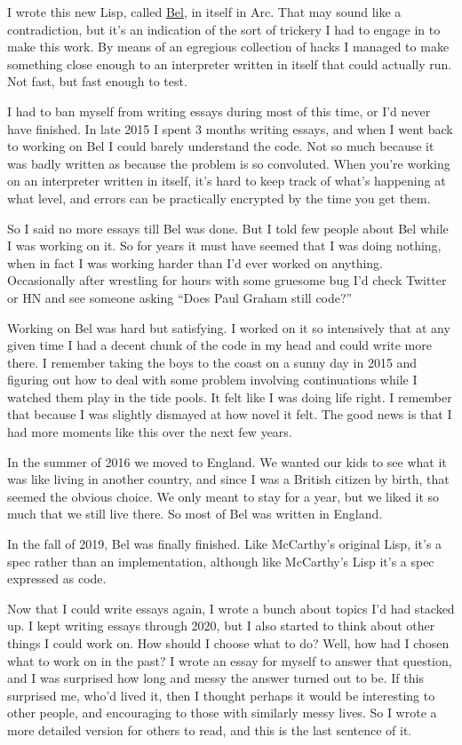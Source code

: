 I wrote this new Lisp, called \href{bel.html}{Bel}, in itself in Arc.
That may sound like a contradiction, but it's an indication of the sort
of trickery I had to engage in to make this work. By means of an
egregious collection of hacks I managed to make something close enough
to an interpreter written in itself that could actually run. Not fast,
but fast enough to test.

I had to ban myself from writing essays during most of this time, or I'd
never have finished. In late 2015 I spent 3 months writing essays, and
when I went back to working on Bel I could barely understand the code.
Not so much because it was badly written as because the problem is so
convoluted. When you're working on an interpreter written in itself,
it's hard to keep track of what's happening at what level, and errors
can be practically encrypted by the time you get them.

So I said no more essays till Bel was done. But I told few people about
Bel while I was working on it. So for years it must have seemed that I
was doing nothing, when in fact I was working harder than I'd ever
worked on anything. Occasionally after wrestling for hours with some
gruesome bug I'd check Twitter or HN and see someone asking ``Does Paul
Graham still code?''

Working on Bel was hard but satisfying. I worked on it so intensively
that at any given time I had a decent chunk of the code in my head and
could write more there. I remember taking the boys to the coast on a
sunny day in 2015 and figuring out how to deal with some problem
involving continuations while I watched them play in the tide pools. It
felt like I was doing life right. I remember that because I was slightly
dismayed at how novel it felt. The good news is that I had more moments
like this over the next few years.

In the summer of 2016 we moved to England. We wanted our kids to see
what it was like living in another country, and since I was a British
citizen by birth, that seemed the obvious choice. We only meant to stay
for a year, but we liked it so much that we still live there. So most of
Bel was written in England.

In the fall of 2019, Bel was finally finished. Like McCarthy's original
Lisp, it's a spec rather than an implementation, although like
McCarthy's Lisp it's a spec expressed as code.

Now that I could write essays again, I wrote a bunch about topics I'd
had stacked up. I kept writing essays through 2020, but I also started
to think about other things I could work on. How should I choose what to
do? Well, how had I chosen what to work on in the past? I wrote an essay
for myself to answer that question, and I was surprised how long and
messy the answer turned out to be. If this surprised me, who'd lived it,
then I thought perhaps it would be interesting to other people, and
encouraging to those with similarly messy lives. So I wrote a more
detailed version for others to read, and this is the last sentence of
it.

